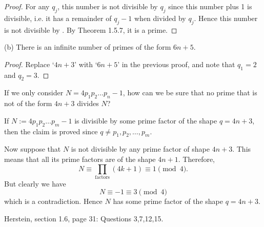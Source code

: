 \begin{enumerate}[resume]
\begin{proof}
	For any $q_j$, this number is not divisible by $q_j$ since this number plus 1 is divisible, i.e. it has a remainder of $q_j - 1$ when divided by $q_j$. Hence this number is not divisible by  . By Theorem 1.5.7, it is a prime.
\end{proof}
(b) There is an infinite number of primes of the form $6 n+5$.
\begin{proof}
	Replace `$4n+3 $' with `$6n+5$' in the previous proof, and note that $q_1 = 2$ and $q_2 = 3$.
\end{proof}
\begin{problem}
	\color{red}
	If we only consider $N = 4p_1p_2\ldots p_n - 1$, how can we be sure that no prime that is not of the form $4n+3$ divides $N$?
\end{problem}
\begin{correction}
If $N:=4p_1p_2 \ldots p_m - 1$ is divisible by some prime factor of the shape $q = 4n+3$, then the claim is proved since $q\neq  p_1, p_2, \ldots, p_m$. 
\linebreak

Now suppose that $N$ is not divisible by any prime factor of shape $4n+3$. This means that all its prime factors are of the shape $4n+1$. Therefore,
\[
N \equiv \prod_{\text{factors}} (4k+1) \equiv 1 \pmod 4  
.\] 
But clearly we have \[
	N \equiv -1 \equiv 3 \pmod 4
\]
which is a contradiction. Hence $N$ has some prime factor of the shape $q = 4n+3$.
\end{correction}
\end{enumerate}
Herstein, section 1.6, page 31: Questions 3,7,12,15.
